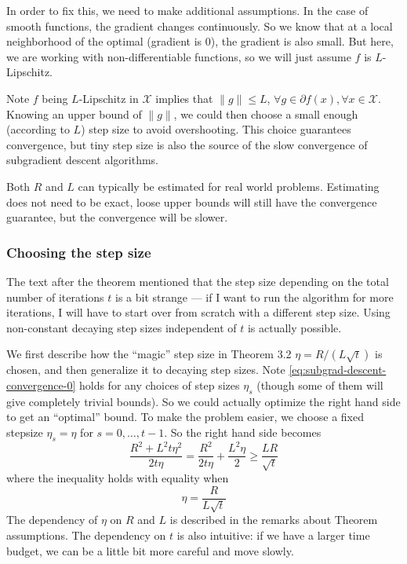\documentclass{scrartcl}
\newcommand{\sX}{\mathcal{X}}
\begin{document}
In order to fix this, we need to make additional assumptions. In the case of
smooth functions, the gradient changes continuously. So we know that at a local neighborhood of the
optimal (gradient is 0), the gradient is also small. But here, we are working with
non-differentiable functions, so we will just assume $f$ is $L$-Lipschitz.

Note $f$ being $L$-Lipschitz in $\sX$ implies that $\|g\| \leq L$, $\forall g\in\partial f(x),
\forall x\in\sX$. Knowing an upper bound of $\|g\|$, we could then choose a small enough (according
to $L$) step size to avoid overshooting. This choice guarantees convergence, but tiny step size is
also the source of the slow convergence of subgradient descent algorithms.

Both $R$ and $L$ can typically be estimated for real world problems. Estimating does not need to be
exact, loose upper bounds will still have the convergence guarantee, but the convergence will be
slower.

\subsubsection*{Choosing the step size}
The text after the theorem mentioned that the step size depending on the total number of iterations
$t$ is a bit strange --- if I want to run the algorithm for more iterations, I will have to start
over from scratch with a different step size. Using non-constant decaying step sizes independent of
$t$ is actually possible.

We first describe how the ``magic'' step size in Theorem 3.2 $\eta=R/(L\sqrt{t})$ is chosen, and
then generalize it to decaying step sizes.
Note \eqref{eq:subgrad-descent-convergence-0} holds for any choices of step sizes $\eta_s$ (though
some of them will give completely trivial bounds). So we could actually optimize the right hand side
to get an ``optimal'' bound. To make the problem easier, we choose a fixed stepsize $\eta_s=\eta$
for $s=0,\ldots,t-1$. So the right hand side becomes
\begin{equation}
  \frac{R^2+L^2t\eta^2}{2t\eta} = \frac{R^2}{2t\eta} + \frac{L^2\eta}{2} \geq \frac{LR}{\sqrt{t}}
  \label{eq:subgrad-bound-fix-eta}
\end{equation}
where the inequality holds with equality when
\begin{equation}
  \eta = \frac{R}{L\sqrt{t}}
\end{equation}
The dependency of $\eta$ on $R$ and $L$ is described in the remarks about Theorem assumptions. The
dependency on $t$ is also intuitive: if we have a larger time budget, we can be a little bit more
careful and move slowly.
\end{document}
